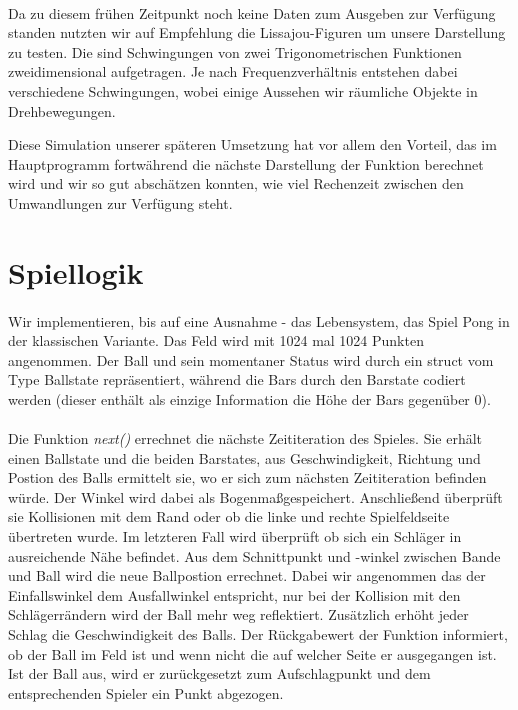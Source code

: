 \paragraph*{}
Da zu diesem frühen Zeitpunkt noch keine Daten zum Ausgeben zur Verfügung standen nutzten wir auf Empfehlung die Lissajou-Figuren um unsere Darstellung zu testen. Die sind Schwingungen von zwei Trigonometrischen Funktionen zweidimensional aufgetragen. Je nach Frequenzverhältnis entstehen dabei verschiedene Schwingungen, wobei einige Aussehen wir räumliche Objekte in Drehbewegungen. 



Diese Simulation unserer späteren Umsetzung hat vor allem den Vorteil, das im Hauptprogramm fortwährend die nächste Darstellung der Funktion berechnet wird und wir so gut abschätzen konnten, wie viel Rechenzeit zwischen den Umwandlungen zur Verfügung steht.

\section*{Spiellogik}

\paragraph*{}
Wir implementieren, bis auf eine Ausnahme - das Lebensystem,  das Spiel Pong in der klassischen Variante. Das Feld wird mit 1024 mal 1024 Punkten angenommen. Der Ball und sein momentaner Status wird durch ein struct vom Type Ballstate repräsentiert, während die Bars durch den Barstate codiert werden (dieser enthält als einzige Information die Höhe der Bars gegenüber 0). 

\paragraph*{}
Die Funktion {\em next()} errechnet die nächste Zeititeration des Spieles. Sie erhält einen Ballstate und die beiden Barstates, aus Geschwindigkeit, Richtung und Postion des Balls ermittelt sie, wo er sich zum nächsten Zeititeration befinden würde. Der Winkel wird dabei als Bogenmaßgespeichert. Anschließend überprüft sie Kollisionen mit dem Rand oder ob die linke und rechte Spielfeldseite übertreten wurde. Im letzteren Fall wird überprüft ob sich ein Schläger in ausreichende Nähe befindet. Aus dem Schnittpunkt und -winkel zwischen Bande und Ball wird die neue Ballpostion errechnet. Dabei wir angenommen das der Einfallswinkel dem Ausfallwinkel entspricht, nur bei der Kollision mit den Schlägerrändern wird der Ball mehr weg reflektiert.  Zusätzlich erhöht jeder Schlag die Geschwindigkeit des Balls. Der Rückgabewert der Funktion informiert, ob der Ball im Feld ist und wenn nicht die auf welcher Seite er ausgegangen ist. Ist der Ball aus, wird er zurückgesetzt zum Aufschlagpunkt und dem entsprechenden Spieler ein Punkt abgezogen. 

